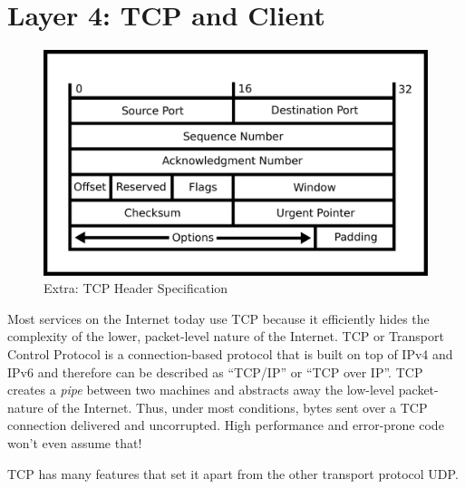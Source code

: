 \section{Layer 4: TCP and Client}

\begin{figure}[H]
  \centering
\includegraphics[width=.8\textwidth]{networking/drawings/tcp_header.eps}
\caption{Extra: TCP Header Specification}
\end{figure}

Most services on the Internet today use TCP because it efficiently hides the complexity of the lower, packet-level nature of the Internet.
TCP or Transport Control Protocol is a connection-based protocol that is built on top of IPv4 and IPv6 and therefore can be described as ``TCP/IP'' or ``TCP over IP''.
TCP creates a \emph{pipe} between two machines and abstracts away the low-level packet-nature of the Internet. Thus, under most conditions, bytes sent over a TCP connection delivered and uncorrupted.
High performance and error-prone code won't even assume that!

TCP has many features that set it apart from the other transport protocol UDP.

